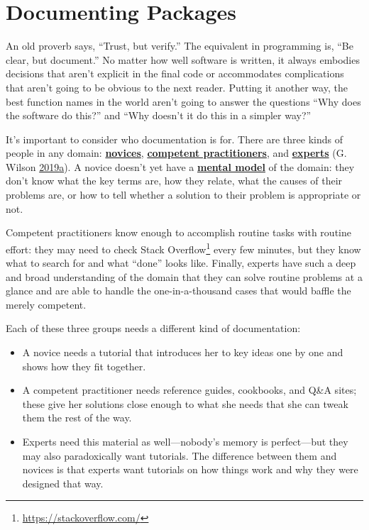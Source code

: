 \documentclass[
]{krantz}
\renewcommand{\href}[2]{#2\footnote{\url{#1}}}
\newcommand{\gref}[2]{\hyperlink{#2}{\textbf{#1}}}
\begin{document}
\hypertarget{packaging-document}{%
\section{Documenting Packages}\label{packaging-document}}

An old proverb says, ``Trust, but verify.''
The equivalent in programming is, ``Be clear, but document.''
No matter how well software is written,
it always embodies decisions that aren't explicit in the final code
or accommodates complications that aren't going to be obvious to the next reader.
Putting it another way,
the best function names in the world aren't going to answer the questions
``Why does the software do this?''
and
``Why doesn't it do this in a simpler way?''

It's important to consider who documentation is for.
There are three kinds of people in any domain:
\gref{novices}{novice},
\gref{competent practitioners}{competent\_practitioner},
and \gref{experts}{expert} (G. Wilson \protect\hyperlink{ref-Wils2018}{2019}\protect\hyperlink{ref-Wils2018}{a}).
A novice doesn't yet have a \gref{mental model}{mental\_model} of the domain:
they don't know what the key terms are,
how they relate,
what the causes of their problems are,
or how to tell whether a solution to their problem is appropriate or not.

Competent practitioners know enough to accomplish routine tasks with routine effort:
they may need to check \href{https://stackoverflow.com/}{Stack Overflow} every few minutes,
but they know what to search for and what ``done'' looks like.
Finally,
experts have such a deep and broad understanding of the domain
that they can solve routine problems at a glance
and are able to handle the one-in-a-thousand cases
that would baffle the merely competent.

Each of these three groups needs a different kind of documentation:

\begin{itemize}
\item
  A novice needs a tutorial that introduces her to key ideas one by one
  and shows how they fit together.
\item
  A competent practitioner needs reference guides, cookbooks, and Q\&A sites;
  these give her solutions close enough to what she needs
  that she can tweak them the rest of the way.
\item
  Experts need this material as well---nobody's memory is perfect---but
  they may also paradoxically want tutorials.
  The difference between them and novices is that experts want tutorials on how things work
  and why they were designed that way.
\end{itemize}
\end{document}

